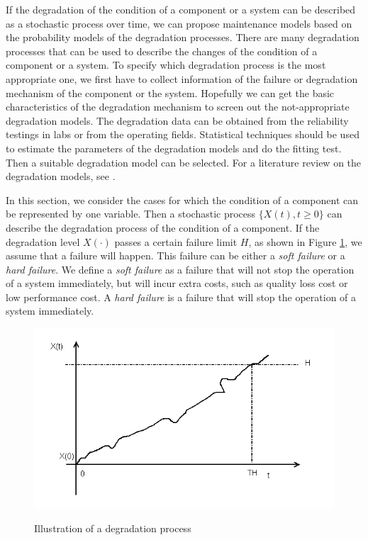 \documentclass[10pt,a4paper]{article}
\theoremstyle{remark}
\begin{document}
If the degradation of the condition of a component or a system can be described as a stochastic process over time, we can propose maintenance models based on the probability models of the degradation processes. There are many degradation processes that can be used to describe the changes of the condition of a component or a system. To specify which degradation process is the most appropriate one, we first have to collect information of the failure or degradation mechanism of the component or the system. Hopefully we can get the basic characteristics of the degradation mechanism to screen out the not-appropriate degradation models. The degradation data can be obtained from the reliability testings in labs or from the operating fields. Statistical techniques should be used to estimate the parameters of the degradation models and do the fitting test. Then a suitable degradation model can be selected. For a literature review on the degradation models, see \cite{ZhuPengvanHoutum14}. 

In this section, we consider the cases for which the condition of a component can be represented by one variable. Then a stochastic process $\{X(t),t\geq 0\}$ can describe the degradation process of the condition of a component. If the degradation level $X(\cdot)$ passes a certain failure limit $H$, as shown in Figure \ref{pic:degradation1}, we assume that a failure will happen. This failure can be either a \textit{soft failure} or a \textit{hard failure}. We define a \textit{soft failure} as a failure that will not stop the operation of a system immediately, but will incur extra costs, such as quality loss cost or low performance cost. A \textit{hard failure} is a failure that will stop the operation of a system immediately. 

\begin{figure}[h!!!]  %
  \centering
  \includegraphics[width=6in]{Degradation1.png}\\
  \footnotesize
  \caption{ \footnotesize{Illustration of a degradation process} }\label{pic:degradation1}
\end{figure}
\end{document}
